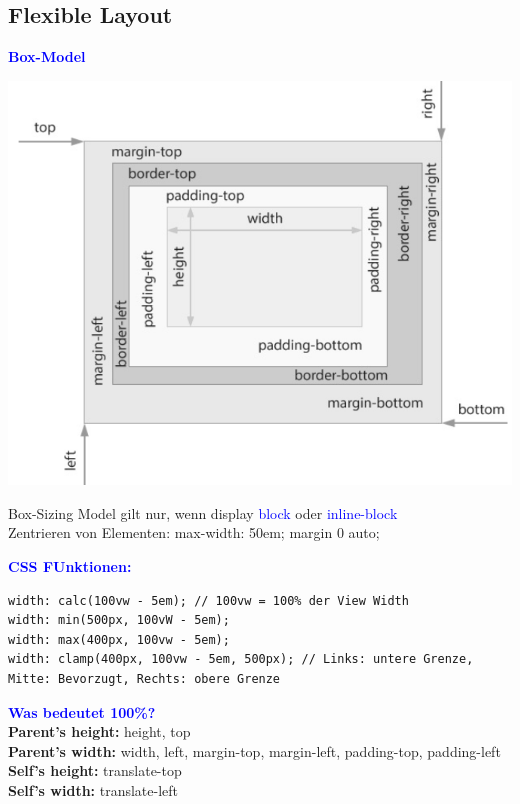 \subsection{Flexible Layout}
\textbf{\textcolor{blue}{Box-Model}}\\
\begin{minipage}{0.63\linewidth}
    \includegraphics{media/css_display.png}
\end{minipage}
\begin{minipage}{0.37\linewidth}
    Box-Sizing Model gilt nur, wenn display \textcolor{blue}{block} oder \textcolor{blue}{inline-block}\\
    Zentrieren von Elementen: max-width: 50em; margin 0 auto;
\end{minipage}
\textbf{\textcolor{blue}{CSS FUnktionen:}}
\begin{lstlisting}[style=htmlcssjs]
width: calc(100vw - 5em); // 100vw = 100% der View Width
width: min(500px, 100vW - 5em);
width: max(400px, 100vw - 5em);
width: clamp(400px, 100vw - 5em, 500px); // Links: untere Grenze, Mitte: Bevorzugt, Rechts: obere Grenze
\end{lstlisting}
\textbf{\textcolor{blue}{Was bedeutet 100\%?}}\\
\textbf{Parent's height:} height, top\\
\textbf{Parent's width:} width, left, margin-top, margin-left, padding-top, padding-left\\
\textbf{Self's height:} translate-top\\
\textbf{Self's width:} translate-left\\
